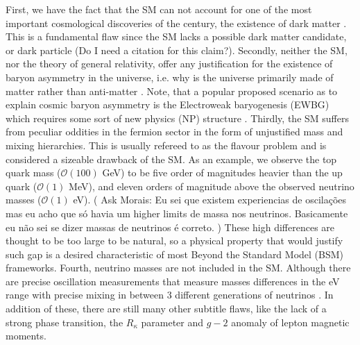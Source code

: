 First, we have the fact that the SM can not account for one of the most important cosmological discoveries of the century, the existence of dark matter \cite{Bergstr_m_2000}. 
%
This is a fundamental flaw since the SM lacks a possible dark matter candidate, or dark particle {\color{red} (Do I need a citation for this claim?).} 
%
Secondly, neither the SM,  nor the theory of general relativity, offer any justification for the existence of baryon asymmetry in the universe, i.e. why is the universe primarily made of matter rather than anti-matter \cite{book_Baryion}. 
%
Note, that a popular proposed scenario as to explain cosmic baryon asymmetry is the Electroweak baryogenesis (EWBG) which requires some sort of new physics (NP) structure \cite{Morrissey2012}. 
%
Thirdly, the SM suffers from peculiar oddities in the fermion sector in the form of unjustified mass and mixing hierarchies. This is usually refereed to as the flavour problem and is considered a sizeable drawback of the SM. 
%
As an example, we observe the top quark mass ($\mathcal{O}(100)$ GeV) to be five order of magnitudes heavier than the up quark ($\mathcal{O}(1)$ MeV), and eleven orders of magnitude above the observed neutrino masses ($\mathcal{O}(1)$ eV).
%
{ ( \color{red} Ask Morais: Eu sei que existem experiencias de oscilações mas eu acho que só havia um higher limits de massa nos neutrinos. Basicamente eu não sei se dizer massas de neutrinos é correto. ) } 
%
These high differences are thought to be too large to be natural, so a physical property that would justify such gap is a desired characteristic of most Beyond the Standard Model (BSM) frameworks. 
%
Fourth, neutrino masses are not included in the SM. Although there are precise oscillation measurements that measure masses differences in the eV range with precise mixing in between 3 different generations of neutrinos \cite{PhysRevD.89.013001}. 
%
In addition of these, there are still many other subtitle flaws, like the lack of a strong phase transition, the $R_{\kappa}$ parameter and $g-2$ anomaly of lepton magnetic moments. 

